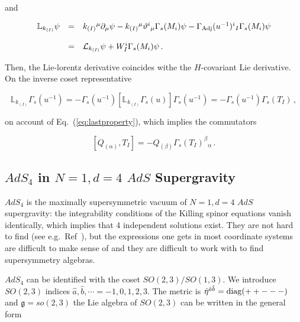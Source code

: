 \documentclass[12pt,a4paper]{article}
\begin{document}
\noindent
and

\begin{equation}
  \begin{array}{rcl}
\mathbb{L}_{k_{(I)}}\psi & = &   
k_{(I)}{}^{\mu}\partial_{\mu}\psi -
k_{(I)}{}^{\mu}\vartheta^{i}{}_{\mu}\Gamma_{s}(M_{i})\psi
-\Gamma_{\rm Adj}(u^{-1})^{i}{}_{I}\Gamma_{s}(M_{i}) \psi \\
& & \\
& = &
\mathcal{L}_{k_{(I)}}\psi + W_{I}^{i}\Gamma_{s}(M_{i}) \psi\, .\\
\end{array}
\end{equation}

Then, the Lie-lorentz derivative coincides withe the $H$-covariant
Lie derivative. On the inverse coset representative

\begin{equation}
\mathbb{L}_{k_{(I)}} \Gamma_{s}(u^{-1}) =
-\Gamma_{s}(u^{-1}) 
[\mathbb{L}_{k_{(I)}} \Gamma_{s}(u)] \Gamma_{s}(u^{-1}) = 
-\Gamma_{s}(u^{-1}) \Gamma_{s}(T_{I})\, ,
\end{equation}

\noindent 
on account of Eq.~(\ref{eq:lastproperty}), which implies the commutators

\begin{equation}
\label{eq:QTcommutators}
[Q_{(\alpha)},T_{I}] = -Q_{(\beta)}  \Gamma_{s}(T_{I})^{\beta}{}_{\alpha}\, .
\end{equation}



\subsection{$AdS_{4}$ in $N=1,d=4$ $AdS$ Supergravity}
\label{sec-AdSKS}

$AdS_{4}$ is the maximally supersymmetric vacuum of $N=1,d=4$ $AdS$
supergravity: the integrability conditions of the Killing spinor
equations vanish identically, which implies that 4 independent
solutions exist. They are not hard to find (see
e.g.~Ref~\cite{Lu:1998nu}), but the expressions one gets in most
coordinate systems are difficult to make sense of and they are
difficult to work with to find supersymmetry algebras.

$AdS_{4}$ can be identified with the coset $SO(2,3)/SO(1,3)$. We
introduce $SO(2,3)$ indices $\hat{a},\hat{b},\cdots=-1,0,1,2,3$. The
metric is $\hat{\eta}^{\hat{a}\hat{b}}={\rm diag}(++---)$ and
$\mathfrak{g}=so(2,3)$ the Lie algebra of $SO(2,3)$ can be written in
the general form
\end{document}
